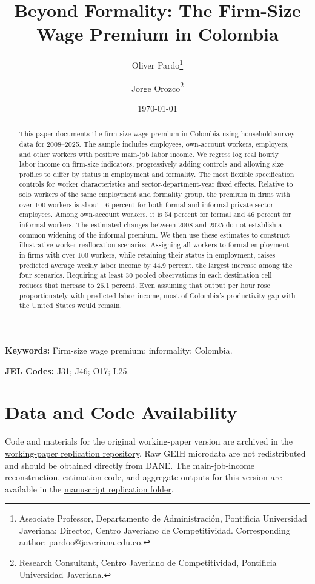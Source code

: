 \documentclass[12pt]{article}
\title{Beyond Formality: The Firm-Size Wage Premium in Colombia}
\author{
Oliver Pardo\thanks{Associate Professor, Departamento de Administración, Pontificia Universidad Javeriana; Director, Centro Javeriano de Competitividad. Corresponding author: \href{mailto:pardoo@javeriana.edu.co}{pardoo@javeriana.edu.co}.}
\and
Jorge Orozco\thanks{Research Consultant, Centro Javeriano de Competitividad, Pontificia Universidad Javeriana.}
}
\date{\today}
\begin{document}
\maketitle

\begin{abstract}
This paper documents the firm-size wage premium in Colombia using household survey data for 2008--2025. The sample includes employees, own-account workers, employers, and other workers with positive main-job labor income. We regress log real hourly labor income on firm-size indicators, progressively adding controls and allowing size profiles to differ by status in employment and formality. The most flexible specification controls for worker characteristics and sector-department-year fixed effects. Relative to solo workers of the same employment and formality group, the premium in firms with over 100 workers is about 16 percent for both formal and informal private-sector employees. Among own-account workers, it is 54 percent for formal and 46 percent for informal workers. The estimated changes between 2008 and 2025 do not establish a common widening of the informal premium. We then use these estimates to construct illustrative worker reallocation scenarios. Assigning all workers to formal employment in firms with over 100 workers, while retaining their status in employment, raises predicted average weekly labor income by 44.9 percent, the largest increase among the four scenarios. Requiring at least 30 pooled observations in each destination cell reduces that increase to 26.1 percent. Even assuming that output per hour rose proportionately with predicted labor income, most of Colombia's productivity gap with the United States would remain.
\end{abstract}

\vspace{0.5em}
\noindent\textbf{Keywords:} Firm-size wage premium; informality; Colombia.

\vspace{0.5em}
\noindent\textbf{JEL Codes:} J31; J46; O17; L25.










\appendix


\section*{Data and Code Availability}

Code and materials for the original working-paper version are archived in the
\href{https://github.com/Kin-George/CJC-Monitor/tree/working-paper-v1-2026-06-13}{working-paper replication repository}.
Raw GEIH microdata are not redistributed and should be obtained directly from DANE.
The main-job-income reconstruction, estimation code, and aggregate outputs for this version
are available in the
\href{https://github.com/oliverpardo1979/Again-Firm-Size-Paper/tree/main/replication}{manuscript replication folder}.



\end{document}
